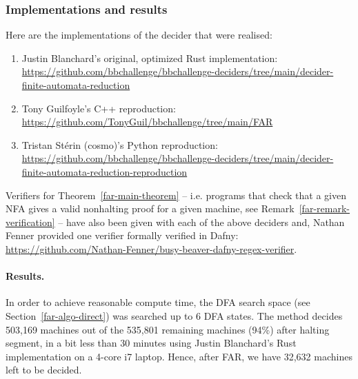 \subsubsection{Implementations and results}\label{sec:far-implem}

Here are the implementations of the decider that were realised:

\begin{enumerate}
    \item Justin Blanchard's original, optimized Rust implementation: \url{https://github.com/bbchallenge/bbchallenge-deciders/tree/main/decider-finite-automata-reduction}
    \item Tony Guilfoyle's C++ reproduction: \url{https://github.com/TonyGuil/bbchallenge/tree/main/FAR}
    \item Tristan Stérin (cosmo)'s Python reproduction: \url{https://github.com/bbchallenge/bbchallenge-deciders/tree/main/decider-finite-automata-reduction-reproduction}
\end{enumerate}


Verifiers for Theorem~\ref{far-main-theorem} -- i.e. programs that check that a given NFA gives a valid nonhalting proof for a given machine, see Remark~\ref{far-remark-verification} -- have also been given with each of the above deciders and, Nathan Fenner provided one verifier formally verified in Dafny: \url{https://github.com/Nathan-Fenner/busy-beaver-dafny-regex-verifier}.


\paragraph*{Results.} In order to achieve reasonable compute time, the DFA search space (see Section~\ref{far-algo-direct}) was searched up to 6 DFA states. The method decides 503,169 machines out of the 535,801 remaining machines (94\%) after halting segment, in a bit less than 30 minutes using Justin Blanchard's Rust implementation on a 4-core i7 laptop. Hence, after FAR, we have 32,632 machines left to be decided.
